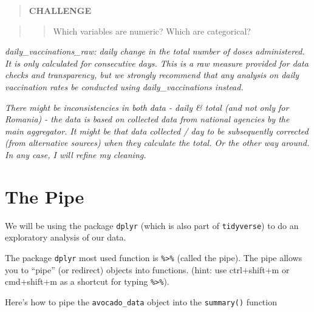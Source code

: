 \documentclass[
]{book}
\newenvironment{Shaded}{\begin{snugshade}}{\end{snugshade}}
\newcommand{\CommentTok}[1]{\textcolor[rgb]{0.56,0.35,0.01}{\textit{#1}}}
\newcommand{\KeywordTok}[1]{\textcolor[rgb]{0.13,0.29,0.53}{\textbf{#1}}}
\newcommand{\NormalTok}[1]{#1}
\newcommand{\OperatorTok}[1]{\textcolor[rgb]{0.81,0.36,0.00}{\textbf{#1}}}
\newcommand{\StringTok}[1]{\textcolor[rgb]{0.31,0.60,0.02}{#1}}
\begin{document}
\begin{quote}
\textbf{CHALLENGE}
\end{quote}

\begin{quote}
\begin{quote}
Which variables are numeric? Which are categorical?
\end{quote}
\end{quote}

\emph{daily\_vaccinations\_raw: daily change in the total number of doses administered. It is only calculated for consecutive days. This is a raw measure provided for data checks and transparency, but we strongly recommend that any analysis on daily vaccination rates be conducted using daily\_vaccinations instead.}

\emph{There might be inconsistencies in both data - daily \& total (and not only for Romania) - the data is based on collected data from national agencies by the main aggregator. It might be that data collected / day to be subsequently corrected (from alternative sources) when they calculate the total. Or the other way around. In any case, I will refine my cleaning.}

\hypertarget{the-pipe}{%
\section{The Pipe}\label{the-pipe}}

We will be using the package \texttt{dplyr} (which is also part of \texttt{tidyverse}) to do an exploratory analysis of our data.

The package \texttt{dplyr} most used function is \texttt{\%\textgreater{}\%} (called the pipe). The pipe allows you to ``pipe'' (or redirect) objects into functions. (hint: use ctrl+shift+m or cmd+shift+m as a shortcut for typing \texttt{\%\textgreater{}\%}).

Here's how to pipe the \texttt{avocado\_data} object into the \texttt{summary()} function

\begin{Shaded}
\end{Shaded}
\end{document}
